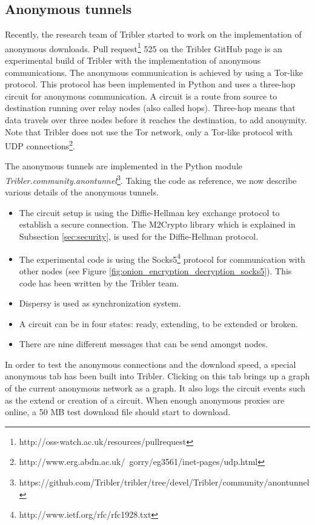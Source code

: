 	\subsection{Anonymous tunnels}
		\label{sec:anonymoustunnels}
			Recently, the research team of Tribler started to work on the implementation of anonymous downloads. Pull request\footnote{http://oss-watch.ac.uk/resources/pullrequest} 525 on the Tribler GitHub page \cite{pullrequest525} is an experimental build of Tribler with the implementation of anonymous communications. The anonymous communication is achieved by using a Tor-like protocol. This protocol has been implemented in Python and uses a three-hop circuit for anonymous communication. A circuit is a route from source to destination running over relay nodes (also called hops). Three-hop means that data travels over three nodes before it reaches the destination, to add anonymity. Note that Tribler does not use the Tor network, only a Tor-like protocol with UDP connections\footnote{http://www.erg.abdn.ac.uk/~gorry/eg3561/inet-pages/udp.html}.
			
			The anonymous tunnels are implemented in the Python module \emph{Tribler.community.anontunnel}\footnote{https://github.com/Tribler/tribler/tree/devel/Tribler/community/anontunnel}. Taking the code as reference, we now describe various details of the anonymous tunnels.
			
			\begin{itemize} 
				\item The circuit setup is using the Diffie-Hellman key exchange protocol to establish a secure connection. The M2Crypto library which is explained in Subsection \ref{sec:security}, is used for the Diffie-Hellman protocol.
				\item The experimental code is using the Socks5\footnote{http://www.ietf.org/rfc/rfc1928.txt} protocol for communication with other nodes (see Figure \ref{fig:onion_encryption_decryption_socks5}). This code has been written by the Tribler team.
				\item Dispersy is used as synchronization system. 
				\item A circuit can be in four states: ready, extending, to be extended or broken.
				\item There are nine different messages that can be send amongst nodes.
			\end{itemize}
			
			In order to test the anonymous connections and the download speed, a special anonymous tab has been built into Tribler. Clicking on this tab brings up a graph of the current anonymous network as a graph. It also logs the circuit events such as the extend or creation of a circuit. When enough anonymous proxies are online, a 50 MB test download file should start to download.
			
